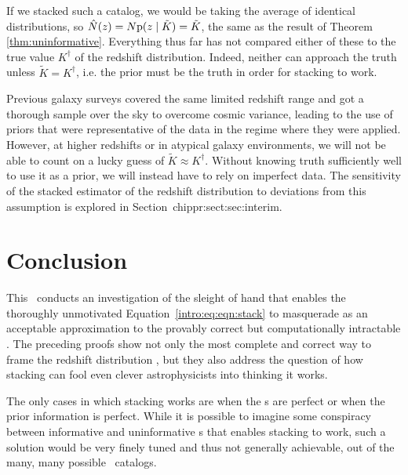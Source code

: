 If we stacked such a catalog, we would be taking the average of identical distributions, so $\hat{N}(z) = N \mathrm{p}(z \mid \tilde{K}) = \tilde{K}$, the same as the result of Theorem \ref{thm:uninformative}.
Everything thus far has not compared either of these to the true value $K^{\dagger}$ of the redshift distribution.
Indeed, neither can approach the truth unless $\tilde{K} = K^{\dagger}$, i.e. the prior must be the truth in order for stacking to work.

Previous galaxy surveys covered the same limited redshift range and got a thorough sample over the sky to overcome cosmic variance, leading to the use of priors that were representative of the data in the regime where they were applied.
However, at higher redshifts or in atypical galaxy environments, we will not be able to count on a lucky guess of $\tilde{K} \approx K^{\dagger}$.
Without knowing truth sufficiently well to use it as a prior, we will instead have to rely on imperfect data.
The sensitivity of the stacked estimator of the redshift distribution to deviations from this assumption is explored in Section~{chippr:sect:sec:interim}.

\section{Conclusion}


This \paper\ conducts an investigation of the sleight of hand that enables the thoroughly unmotivated Equation~\ref{intro:eq:eqn:stack} to masquerade as an acceptable approximation to the provably correct but computationally intractable .
The preceding proofs show not only the most complete and correct way to frame the redshift distribution \Nz, but they also address the question of how stacking can fool even clever astrophysicists into thinking it works.

The only cases in which stacking works are when the \pzpdf s are perfect or when the prior information is perfect.
While it is possible to imagine some conspiracy between informative and uninformative \pzpdf s that enables stacking to work, such a solution would be very finely tuned and thus not generally achievable, out of the many, many possible \pzpdf\ catalogs.

